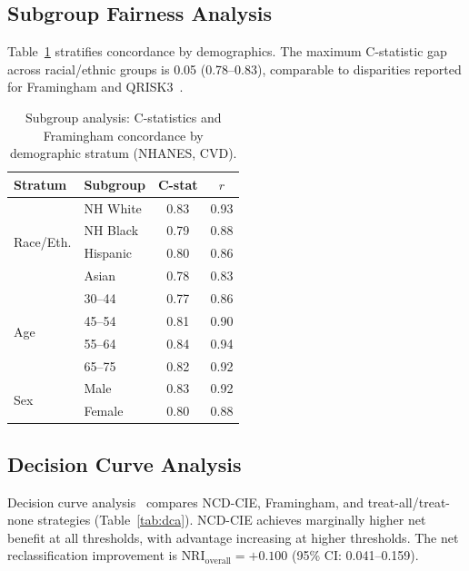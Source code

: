 \documentclass[runningheads]{llncs}
\begin{document}
\subsection{Subgroup Fairness Analysis}\label{sec:subgroup}

Table~\ref{tab:subgroup} stratifies concordance by demographics.
The maximum C-statistic gap across racial/ethnic groups is 0.05
(0.78--0.83), comparable to disparities reported for
Framingham and QRISK3~\cite{hippisley2017qrisk3}.

\begin{table}[t]
\centering
\caption{Subgroup analysis: C-statistics and Framingham concordance
by demographic stratum (NHANES, CVD).}
\label{tab:subgroup}
\small
\begin{tabular}{@{}llcc@{}}
\toprule
\textbf{Stratum} & \textbf{Subgroup} & \textbf{C-stat} & \textbf{$r$} \\
\midrule
\multirow{4}{*}{Race/Eth.}
  & NH White  & 0.83 & 0.93 \\
  & NH Black  & 0.79 & 0.88 \\
  & Hispanic  & 0.80 & 0.86 \\
  & Asian     & 0.78 & 0.83 \\
\midrule
\multirow{4}{*}{Age}
  & 30--44    & 0.77 & 0.86 \\
  & 45--54    & 0.81 & 0.90 \\
  & 55--64    & 0.84 & 0.94 \\
  & 65--75    & 0.82 & 0.92 \\
\midrule
\multirow{2}{*}{Sex}
  & Male      & 0.83 & 0.92 \\
  & Female    & 0.80 & 0.88 \\
\bottomrule
\end{tabular}
\end{table}

\subsection{Decision Curve Analysis}\label{sec:dca}

Decision curve analysis~\cite{vickers2006dca} compares NCD-CIE,
Framingham, and treat-all/treat-none strategies
(Table~\ref{tab:dca}).  NCD-CIE achieves marginally higher net benefit
at all thresholds, with advantage increasing at higher thresholds.
The net reclassification improvement is $\text{NRI}_{\text{overall}} =
+0.100$ (95\% CI: 0.041--0.159).
\end{document}
